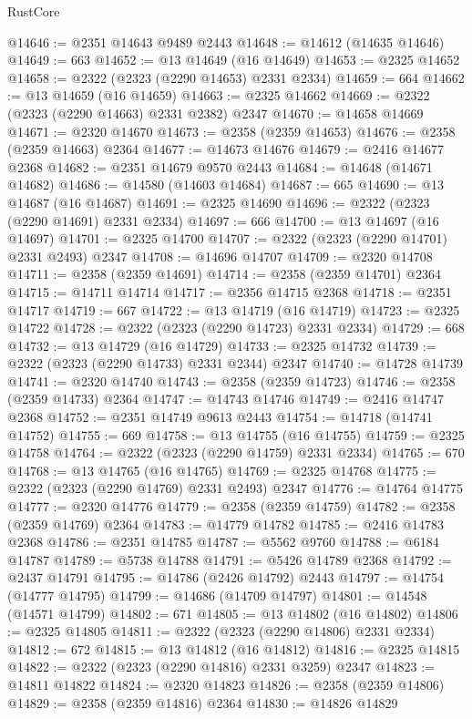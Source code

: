 \begin{lexlean}{RustCore}
\begin{coremodule}
@14646 := @2351 @14643 @9489 @2443
@14648 := @14612 (@14635 @14646)
@14649 := 663
@14652 := @13 @14649 (@16 @14649)
@14653 := @2325 @14652
@14658 := @2322 (@2323 (@2290 @14653) @2331 @2334)
@14659 := 664
@14662 := @13 @14659 (@16 @14659)
@14663 := @2325 @14662
@14669 := @2322 (@2323 (@2290 @14663) @2331 @2382) @2347
@14670 := @14658 @14669
@14671 := @2320 @14670
@14673 := @2358 (@2359 @14653)
@14676 := @2358 (@2359 @14663) @2364
@14677 := @14673 @14676
@14679 := @2416 @14677 @2368
@14682 := @2351 @14679 @9570 @2443
@14684 := @14648 (@14671 @14682)
@14686 := @14580 (@14603 @14684)
@14687 := 665
@14690 := @13 @14687 (@16 @14687)
@14691 := @2325 @14690
@14696 := @2322 (@2323 (@2290 @14691) @2331 @2334)
@14697 := 666
@14700 := @13 @14697 (@16 @14697)
@14701 := @2325 @14700
@14707 := @2322 (@2323 (@2290 @14701) @2331 @2493) @2347
@14708 := @14696 @14707
@14709 := @2320 @14708
@14711 := @2358 (@2359 @14691)
@14714 := @2358 (@2359 @14701) @2364
@14715 := @14711 @14714
@14717 := @2356 @14715 @2368
@14718 := @2351 @14717
@14719 := 667
@14722 := @13 @14719 (@16 @14719)
@14723 := @2325 @14722
@14728 := @2322 (@2323 (@2290 @14723) @2331 @2334)
@14729 := 668
@14732 := @13 @14729 (@16 @14729)
@14733 := @2325 @14732
@14739 := @2322 (@2323 (@2290 @14733) @2331 @2344) @2347
@14740 := @14728 @14739
@14741 := @2320 @14740
@14743 := @2358 (@2359 @14723)
@14746 := @2358 (@2359 @14733) @2364
@14747 := @14743 @14746
@14749 := @2416 @14747 @2368
@14752 := @2351 @14749 @9613 @2443
@14754 := @14718 (@14741 @14752)
@14755 := 669
@14758 := @13 @14755 (@16 @14755)
@14759 := @2325 @14758
@14764 := @2322 (@2323 (@2290 @14759) @2331 @2334)
@14765 := 670
@14768 := @13 @14765 (@16 @14765)
@14769 := @2325 @14768
@14775 := @2322 (@2323 (@2290 @14769) @2331 @2493) @2347
@14776 := @14764 @14775
@14777 := @2320 @14776
@14779 := @2358 (@2359 @14759)
@14782 := @2358 (@2359 @14769) @2364
@14783 := @14779 @14782
@14785 := @2416 @14783 @2368
@14786 := @2351 @14785
@14787 := @5562 @9760
@14788 := @6184 @14787
@14789 := @5738 @14788
@14791 := @5426 @14789 @2368
@14792 := @2437 @14791
@14795 := @14786 (@2426 @14792) @2443
@14797 := @14754 (@14777 @14795)
@14799 := @14686 (@14709 @14797)
@14801 := @14548 (@14571 @14799)
@14802 := 671
@14805 := @13 @14802 (@16 @14802)
@14806 := @2325 @14805
@14811 := @2322 (@2323 (@2290 @14806) @2331 @2334)
@14812 := 672
@14815 := @13 @14812 (@16 @14812)
@14816 := @2325 @14815
@14822 := @2322 (@2323 (@2290 @14816) @2331 @3259) @2347
@14823 := @14811 @14822
@14824 := @2320 @14823
@14826 := @2358 (@2359 @14806)
@14829 := @2358 (@2359 @14816) @2364
@14830 := @14826 @14829

\end{coremodule}
\end{lexlean}
